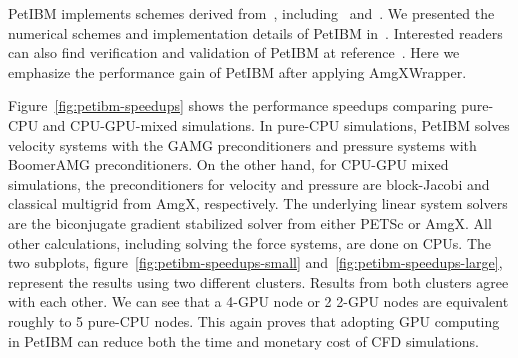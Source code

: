 
PetIBM implements schemes derived from~\cite{Perot1993}, including~\cite{Taira2007} and~\cite{Li2016}.
We presented the numerical schemes and implementation details of PetIBM in~\cite{chuang_petibm:_2018}.
Interested readers can also find verification and validation of PetIBM at reference~\cite{mesnard_petibm_nodate}.
Here we emphasize the performance gain of PetIBM after applying AmgXWrapper.

Figure~\ref{fig:petibm-speedups} shows the performance speedups comparing pure-CPU and CPU-GPU-mixed simulations.
In pure-CPU simulations, PetIBM solves velocity systems with the GAMG preconditioners and pressure systems with BoomerAMG preconditioners.
On the other hand, for CPU-GPU mixed simulations, the preconditioners for velocity and pressure are block-Jacobi and classical multigrid from AmgX, respectively.
The underlying linear system solvers are the biconjugate gradient stabilized solver from either PETSc or AmgX.
All other calculations, including solving the force systems, are done on CPUs.
The two subplots, figure~\ref{fig:petibm-speedups-small} and~\ref{fig:petibm-speedups-large}, represent the results using two different clusters.
Results from both clusters agree with each other.
We can see that a 4-GPU node or 2 2-GPU nodes are equivalent roughly to 5 pure-CPU nodes.
This again proves that adopting GPU computing in PetIBM can reduce both the time and monetary cost of CFD simulations.

